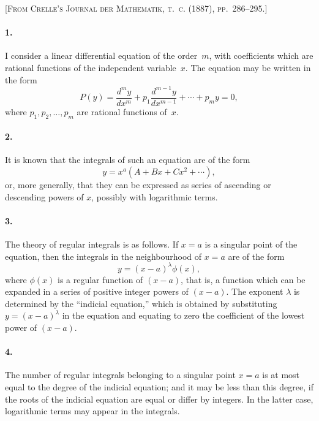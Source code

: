 \documentclass[11pt,a4paper]{book}
\begin{document}
\noindent\textsc{[From Crelle's Journal der Mathematik, t.~c. (1887), pp.~286--295.]}

\smallskip

\paragraph{1.} I consider a linear differential equation of the order~$m$, with coefficients which are rational functions of the independent variable~$x$. The equation may be written in the form
\[
P(y) = \frac{d^{m}y}{dx^{m}} + p_{1}\frac{d^{m-1}y}{dx^{m-1}} + \cdots + p_{m}y = 0,
\]
where $p_{1}, p_{2}, \ldots, p_{m}$ are rational functions of~$x$.

\paragraph{2.} It is known that the integrals of such an equation are of the form
\[
y = x^{a}(A + Bx + Cx^{2} + \cdots),
\]
or, more generally, that they can be expressed as series of ascending or descending powers of $x$, possibly with logarithmic terms.

\paragraph{3.} The theory of regular integrals is as follows. If $x = a$ is a singular point of the equation, then the integrals in the neighbourhood of $x = a$ are of the form
\[
y = (x - a)^{\lambda}\phi(x),
\]
where $\phi(x)$ is a regular function of $(x - a)$, that is, a function which can be expanded in a series of positive integer powers of $(x - a)$. The exponent $\lambda$ is determined by the ``indicial equation,'' which is obtained by substituting $y = (x - a)^{\lambda}$ in the equation and equating to zero the coefficient of the lowest power of $(x - a)$.

\paragraph{4.} The number of regular integrals belonging to a singular point $x = a$ is at most equal to the degree of the indicial equation; and it may be less than this degree, if the roots of the indicial equation are equal or differ by integers. In the latter case, logarithmic terms may appear in the integrals.
\end{document}
